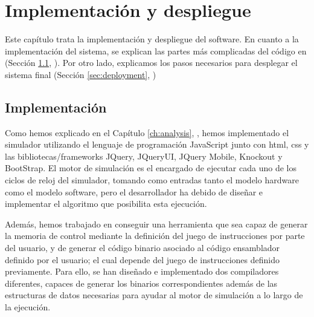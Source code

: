 \chead[]{}
\renewcommand{\headrulewidth}{0.5pt}

\lfoot[]{}
\cfoot[]{}
\rfoot[]{}
\renewcommand{\footrulewidth}{0pt}

\chapter{Implementación y despliegue}
\label{ch:implementation_and_deployment}


Este capítulo trata la implementación y despliegue del \gls{software}. En cuanto a la implementación del sistema, se explican las partes más complicadas del código en (Sección  \ref{sec:implementation}, \textit{}). Por otro lado, explicamos los pasos necesarios para desplegar el sistema final (Sección \ref{sec:deployment}, \textit{})


\section{Implementación}
\label{sec:implementation}


Como hemos explicado en el Capítulo \ref{ch:analysis}, \textit{}, hemos implementado el simulador utilizando el lenguaje de programación JavaScript junto con \acrshort{html}, \acrshort{css} y las bibliotecas/frameworks JQuery, JQueryUI, JQuery Mobile, Knockout y BootStrap. El motor de simulación es el encargado de ejecutar cada uno de los ciclos de reloj del simulador, tomando como entradas tanto el modelo \gls{hardware} como el modelo \gls{software}, pero el desarrollador ha debido de diseñar e implementar el algoritmo que posibilita esta ejecución.

Además, hemos trabajado en conseguir una herramienta que sea capaz de generar la memoria de control mediante la definición del juego de instrucciones por parte del usuario, y de generar el código binario asociado al código \gls{ensamblador} definido por el usuario; el cual depende del juego de instrucciones definido previamente. Para ello, se han diseñado e implementado dos compiladores diferentes, capaces de generar los binarios correspondientes además de las estructuras de datos necesarias para ayudar al motor de simulación a lo largo de la ejecución.

